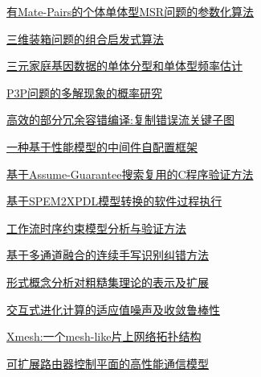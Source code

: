 \documentclass[a4paper]{article}
\begin{document}
\href{http://www.jos.org.cn/ch/reader/download_pdf.aspx?file_no=20070902&year_id=2007&quarter_id=9&falg=1}{有Mate-Pairs的个体单体型MSR问题的参数化算法}

\href{http://www.jos.org.cn/ch/reader/download_pdf.aspx?file_no=20070903&year_id=2007&quarter_id=9&falg=1}{三维装箱问题的组合启发式算法}

\href{http://www.jos.org.cn/ch/reader/download_pdf.aspx?file_no=20070904&year_id=2007&quarter_id=9&falg=1}{三元家庭基因数据的单体分型和单体型频率估计}

\href{http://www.jos.org.cn/ch/reader/download_pdf.aspx?file_no=20070905&year_id=2007&quarter_id=9&falg=1}{P3P问题的多解现象的概率研究}

\href{http://www.jos.org.cn/ch/reader/download_pdf.aspx?file_no=20070906&year_id=2007&quarter_id=9&falg=1}{高效的部分冗余容错编译:复制错误流关键子图}

\href{http://www.jos.org.cn/ch/reader/download_pdf.aspx?file_no=20070907&year_id=2007&quarter_id=9&falg=1}{一种基于性能模型的中间件自配置框架}

\href{http://www.jos.org.cn/ch/reader/download_pdf.aspx?file_no=20070908&year_id=2007&quarter_id=9&falg=1}{基于Assume-Guarantee搜索复用的C程序验证方法}

\href{http://www.jos.org.cn/ch/reader/download_pdf.aspx?file_no=20070909&year_id=2007&quarter_id=9&falg=1}{基于SPEM2XPDL模型转换的软件过程执行}

\href{http://www.jos.org.cn/ch/reader/download_pdf.aspx?file_no=20070910&year_id=2007&quarter_id=9&falg=1}{工作流时序约束模型分析与验证方法}

\href{http://www.jos.org.cn/ch/reader/download_pdf.aspx?file_no=20070911&year_id=2007&quarter_id=9&falg=1}{基于多通道融合的连续手写识别纠错方法}

\href{http://www.jos.org.cn/ch/reader/download_pdf.aspx?file_no=20070912&year_id=2007&quarter_id=9&falg=1}{形式概念分析对粗糙集理论的表示及扩展}

\href{http://www.jos.org.cn/ch/reader/download_pdf.aspx?file_no=20070913&year_id=2007&quarter_id=9&falg=1}{交互式进化计算的适应值噪声及收敛鲁棒性}

\href{http://www.jos.org.cn/ch/reader/download_pdf.aspx?file_no=20070914&year_id=2007&quarter_id=9&falg=1}{Xmesh:一个mesh-like片上网络拓扑结构}

\href{http://www.jos.org.cn/ch/reader/download_pdf.aspx?file_no=20070915&year_id=2007&quarter_id=9&falg=1}{可扩展路由器控制平面的高性能通信模型}
\end{document}
